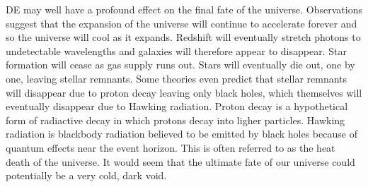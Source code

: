 \documentclass[a4paper,12pt]{article}
\begin{document}
DE may well have a profound effect on the final fate of the universe. Observations suggest that the expansion of the universe will continue to accelerate forever and so the 
universe will cool as it expands. Redshift will eventually stretch photons to undetectable wavelengths and galaxies will therefore appear to disappear. Star formation will cease 
as gas supply runs out. Stars will
eventually die out, one by one, leaving stellar remnants. Some theories even predict that stellar remnants will disappear due to proton decay leaving only black holes,
which themselves will eventually disappear due to Hawking radiation. Proton decay is a hypothetical form of radiactive decay in which protons decay into ligher particles. 
Hawking radiation is blackbody radiation believed to be emitted by black holes because of quantum
effects near the event horizon. This is often referred to as the heat death of the universe. It would seem that the ultimate fate of our universe could potentially be a very 
cold, dark void.
\end{document}

